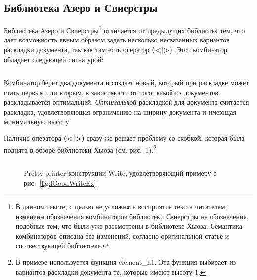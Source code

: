 \newpage

\subsection{Библиотека Азеро и Свиерстры}

Библиотека Азеро и Свиерстры\footnote{
В данном тексте, с целью не усложнять восприятие текста читателем, изменены обозначения комбинаторов библиотеки Свиерстры на обозначения, подобные тем, что были уже рассмотрены в библиотеке Хьюза. Семантика комбинаторов описана без изменений, согласно оригинальной статье и соотвествующей библиотеке.
}\cite{swierstra} отличается от предыдущих библиотек тем, что дает возможность явным образом задать несколько несвязанных вариантов раскладки документа, так как там есть оператор \textbf{(<|>)}. Этот  комбинатор обладает следующей сигнатурой:
\inputminted{haskell}{codes/chooseSw.hs}
Комбинатор берет два документа и создает новый, который при раскладке может стать первым или вторым, в зависимости от того, какой из документов раскладывается оптимальней. \textit{Оптимальной} раскладкой для документа считается раскладка, удовлетворяющая ограничению на ширину документа и имеющая минимальную высоту.

Наличие оператора \textbf{(<|>)} сразу же решает проблему со скобкой, которая была поднята в обзоре библиотеки Хьюза (см. рис.~\ref{fig:bracketSwierstra}).\footnote{
	В примере используется функция element\_h1. Эта функция выбирает из вариантов раскладки документа те, которые имеют высоту 1.
}

\begin{figure}[h!]
	\inputminted{haskell}{codes/bracketSwierstra.hs}
	\caption{Pretty printer конструкции Write, удовлетворяющий примеру с рис.~\ref{fig:lGoodWriteEx}}
	\label{fig:bracketSwierstra}
\end{figure}

